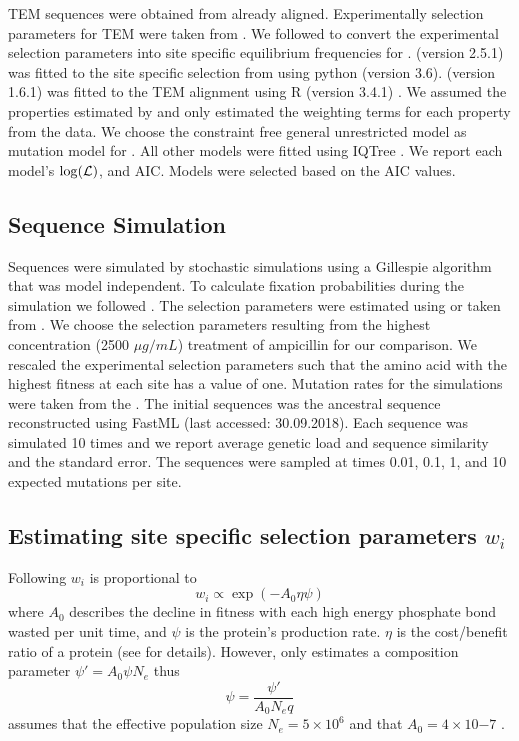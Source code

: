 TEM sequences were obtained from \citet{bloom2017} already aligned.
Experimentally selection parameters for TEM were taken from \citet{stiffler2016}.
We followed \citep{bloom2017} to convert the experimental selection parameters into site specific equilibrium frequencies for \phydms. 
\phydms (version 2.5.1) was fitted to the site specific selection from \citet{stiffler2016} using python (version 3.6).
\selac (version 1.6.1) was fitted to the TEM alignment using R (version 3.4.1) \citep{rcore}.
We assumed the \PC properties estimated by \citet{grantham1974} and only estimated the weighting terms for each property from the data.
We choose the constraint free general unrestricted model \citep{Yang1994} as mutation model for \selac.
All other models were fitted using IQTree \citep{nguyen2015}.
We report each model's $\log(\mathcal{L})$, and AIC.
Models were selected based on the AIC values.

\subsection{Sequence Simulation}

Sequences were simulated by stochastic simulations using a Gillespie algorithm \citep{gillespie1976} that was model independent.
To calculate fixation probabilities during the simulation we followed \citet{SellaAndHirsh2005}.
The selection parameters were estimated using \selac or taken from \citet{stiffler2016}.
We choose the selection parameters resulting from the highest concentration (2500 $\mu g/mL$) treatment of ampicillin for our comparison.
We rescaled the experimental selection parameters such that the amino acid with the highest fitness at each site has a value of one.
Mutation rates for the simulations were taken from the \selac.
The initial sequences was the ancestral sequence reconstructed using FastML \citep{fastml} (last accessed: 30.09.2018).
Each sequence was simulated 10 times and we report average genetic load and sequence similarity and the standard error.
The sequences were sampled at times 0.01, 0.1, 1, and 10 expected mutations per site.

\subsection{Estimating site specific selection parameters $w_i$}

Following \citet{beaulieu2019} $w_i$ is proportional to
\begin{equation}
w_i \propto \exp(-A_0\eta\psi)
\end{equation}
where $A_0$ describes the decline in fitness with each high energy phosphate bond wasted per unit time, and $\psi$ is the protein's production rate.
$\eta$ is the cost/benefit ratio of a protein (see \citep{beaulieu2019} for details). 
However, \selac only estimates a composition parameter $\psi' = A_0\psi N_e$ thus
\begin{equation}
\psi = \frac{\psi'}{A_0N_eq}
\end{equation}
\selac assumes that the effective population size $N_e = 5\times 10^6$ and that $A_0 = 4 \times 10{-7}$ \citep{gilchrist2007}.


